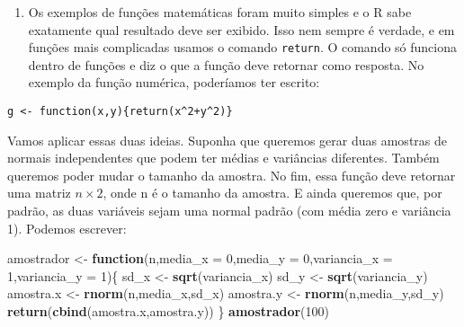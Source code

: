 \documentclass[
]{book}
\newenvironment{Shaded}{\begin{snugshade}}{\end{snugshade}}
\newcommand{\ControlFlowTok}[1]{\textcolor[rgb]{0.13,0.29,0.53}{\textbf{#1}}}
\newcommand{\DataTypeTok}[1]{\textcolor[rgb]{0.13,0.29,0.53}{#1}}
\newcommand{\DecValTok}[1]{\textcolor[rgb]{0.00,0.00,0.81}{#1}}
\newcommand{\KeywordTok}[1]{\textcolor[rgb]{0.13,0.29,0.53}{\textbf{#1}}}
\newcommand{\NormalTok}[1]{#1}
\newcommand{\StringTok}[1]{\textcolor[rgb]{0.31,0.60,0.02}{#1}}
\providecommand{\tightlist}{%
  \setlength{\itemsep}{0pt}\setlength{\parskip}{0pt}}
\begin{document}
\begin{enumerate}
\def\labelenumi{(\arabic{enumi})}
\setcounter{enumi}{3}
\tightlist
\item
  Os exemplos de funções matemáticas foram muito simples e o R sabe exatamente qual resultado deve ser exibido. Isso nem sempre é verdade, e em funções mais complicadas usamos o comando \texttt{return}. O comando só funciona dentro de funções e diz o que a função deve retornar como resposta. No exemplo da função numérica, poderíamos ter escrito:
\end{enumerate}

\begin{verbatim}
g <- function(x,y){return(x^2+y^2)}
\end{verbatim}

Vamos aplicar essas duas ideias. Suponha que queremos gerar duas amostras de normais independentes que podem ter médias e variâncias diferentes. Também queremos poder mudar o tamanho da amostra. No fim, essa função deve retornar uma matriz \(n \times 2\), onde n é o tamanho da amostra. E ainda queremos que, por padrão, as duas variáveis sejam uma normal padrão (com média zero e variância 1). Podemos escrever:

\begin{Shaded}
\begin{Highlighting}[]
\NormalTok{amostrador \textless{}{-}}\StringTok{ }\ControlFlowTok{function}\NormalTok{(n,}\DataTypeTok{media\_x =} \DecValTok{0}\NormalTok{,}\DataTypeTok{media\_y =} \DecValTok{0}\NormalTok{,}\DataTypeTok{variancia\_x =} \DecValTok{1}\NormalTok{,}\DataTypeTok{variancia\_y =} \DecValTok{1}\NormalTok{)\{}
\NormalTok{sd\_x \textless{}{-}}\StringTok{ }\KeywordTok{sqrt}\NormalTok{(variancia\_x)}
\NormalTok{sd\_y \textless{}{-}}\StringTok{ }\KeywordTok{sqrt}\NormalTok{(variancia\_y)}
\NormalTok{amostra.x \textless{}{-}}\StringTok{ }\KeywordTok{rnorm}\NormalTok{(n,media\_x,sd\_x)}
\NormalTok{amostra.y \textless{}{-}}\StringTok{ }\KeywordTok{rnorm}\NormalTok{(n,media\_y,sd\_y)}
\KeywordTok{return}\NormalTok{(}\KeywordTok{cbind}\NormalTok{(amostra.x,amostra.y))}
\NormalTok{\}}
\KeywordTok{amostrador}\NormalTok{(}\DecValTok{100}\NormalTok{)}
\end{Highlighting}
\end{Shaded}
\end{document}
